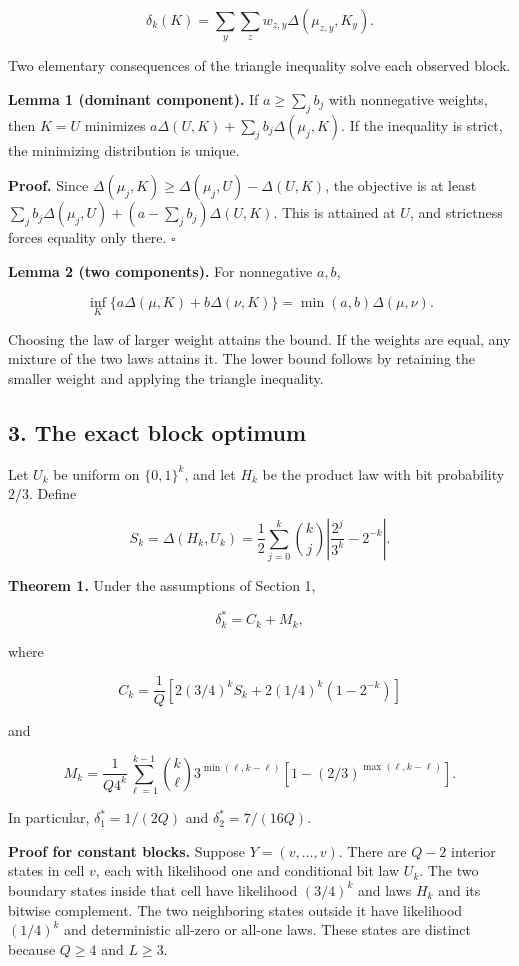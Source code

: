 \documentclass[
]{article}
\begin{document}
\[
\delta_k(K)=\sum_y\sum_z w_{z,y}\Delta(\mu_{z,y},K_y).
\tag{4}
\]

Two elementary consequences of the triangle inequality solve each
observed block.

\textbf{Lemma 1 (dominant component).} If \(a\ge\sum_j b_j\) with
nonnegative weights, then \(K=U\) minimizes
\(a\Delta(U,K)+\sum_j b_j\Delta(\mu_j,K)\). If the inequality is strict,
the minimizing distribution is unique.

\textbf{Proof.} Since \(\Delta(\mu_j,K)\ge\Delta(\mu_j,U)-\Delta(U,K)\),
the objective is at least
\(\sum_j b_j\Delta(\mu_j,U)+(a-\sum_jb_j)\Delta(U,K)\). This is attained
at \(U\), and strictness forces equality only there. \(\square\)

\textbf{Lemma 2 (two components).} For nonnegative \(a,b\),

\[
\inf_K\{a\Delta(\mu,K)+b\Delta(\nu,K)\}
=\min(a,b)\Delta(\mu,\nu).
\tag{5}
\]

Choosing the law of larger weight attains the bound. If the weights are
equal, any mixture of the two laws attains it. The lower bound follows
by retaining the smaller weight and applying the triangle inequality.

\subsection{3. The exact block optimum}\label{the-exact-block-optimum}

Let \(U_k\) be uniform on \(\{0,1\}^k\), and let \(H_k\) be the product
law with bit probability \(2/3\). Define

\[
S_k=\Delta(H_k,U_k)=\frac12\sum_{j=0}^k\binom{k}{j}
\left|\frac{2^j}{3^k}-2^{-k}\right|.
\tag{6}
\]

\textbf{Theorem 1.} Under the assumptions of Section 1,

\[
\delta_k^*=C_k+M_k,
\tag{7}
\]

where

\[
C_k=\frac1Q\left[2(3/4)^kS_k+2(1/4)^k(1-2^{-k})\right]
\tag{8}
\]

and

\[
M_k=\frac1{Q4^k}\sum_{\ell=1}^{k-1}\binom{k}{\ell}3^{\min(\ell,k-\ell)}
\left[1-(2/3)^{\max(\ell,k-\ell)}\right].
\tag{9}
\]

In particular, \(\delta_1^*=1/(2Q)\) and \(\delta_2^*=7/(16Q)\).

\textbf{Proof for constant blocks.} Suppose \(Y=(v,\ldots,v)\). There
are \(Q-2\) interior states in cell \(v\), each with likelihood one and
conditional bit law \(U_k\). The two boundary states inside that cell
have likelihood \((3/4)^k\) and laws \(H_k\) and its bitwise complement.
The two neighboring states outside it have likelihood \((1/4)^k\) and
deterministic all-zero or all-one laws. These states are distinct
because \(Q\ge4\) and \(L\ge3\).
\end{document}
